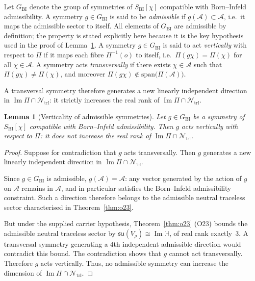 \documentclass[11pt,a4paper]{article}
\newtheorem{lemma}[theorem]{Lemma}
\newcommand{\Ntrl}{\mathcal{N}_{\mathrm{trl}}}
\newcommand{\Aadm}{\mathcal{A}}
\newcommand{\GBI}{G_{\mathrm{BI}}}
\newcommand{\SBI}{S_{\mathrm{BI}}}
\newcommand{\ImH}{\operatorname{Im}\mathbb{H}}
\begin{document}
      Let $\GBI$ denote the group of symmetries of $\SBI[\chi]$ compatible with Born--Infeld
      admissibility.
      A symmetry $g \in \GBI$ is said to be \emph{admissible} if $g(\Aadm) \subset \Aadm$, i.e.\
      it maps the admissible sector to itself.
      All elements of $\GBI$ are admissible by definition; the property is stated explicitly here
      because it is the key hypothesis used in the proof of Lemma~\ref{lem:verticality}.
      A symmetry $g \in \GBI$ is said to act \emph{vertically} with respect to $\Pi$ if it maps
      each fibre $\Pi^{-1}(o)$ to itself, i.e.\ $\Pi(g\chi) = \Pi(\chi)$ for all $\chi \in \Aadm$.
      A symmetry acts \emph{transversally} if there exists $\chi \in \Aadm$ such that
      $\Pi(g\chi) \neq \Pi(\chi)$, and moreover
      $\Pi(g\chi) \notin \mathrm{span}\bigl(\Pi(\Aadm)\bigr)$.

      A transversal symmetry therefore generates a new linearly independent direction in
      $\operatorname{Im}\Pi \cap \Ntrl$: it strictly increases the real rank of
      $\operatorname{Im}\Pi \cap \Ntrl$.

      \begin{lemma}[Verticality of admissible symmetries]
        \label{lem:verticality}
        Let $g \in \GBI$ be a symmetry of $\SBI[\chi]$ compatible with Born--Infeld admissibility.
        Then $g$ acts vertically with respect to $\Pi$: it does not increase the real rank of
        $\operatorname{Im}\Pi \cap \Ntrl$.
      \end{lemma}

      \begin{proof}
        Suppose for contradiction that $g$ acts transversally.
        Then $g$ generates a new linearly independent direction in
        $\operatorname{Im}\Pi \cap \Ntrl$.

        Since $g \in \GBI$ is admissible, $g(\Aadm) = \Aadm$: any vector generated by the action
        of $g$ on $\Aadm$ remains in $\Aadm$, and in particular satisfies the Born--Infeld
        admissibility constraint.
        Such a direction therefore belongs to the admissible neutral traceless sector characterised
        in Theorem~\ref{thm:o23}.

        But under the supplied carrier hypothesis, Theorem~\ref{thm:o23} (O23) bounds the
        admissible neutral traceless sector by $\mathfrak{su}(V_\rho) \cong \ImH$, of real
        rank exactly~$3$.
        A transversal symmetry generating a 4th independent admissible direction would contradict
        this bound.
        The contradiction shows that $g$ cannot act transversally.
        Therefore $g$ acts vertically.
        Thus, no admissible symmetry can increase the dimension of $\operatorname{Im}\Pi \cap \Ntrl$.
      \end{proof}
\end{document}
